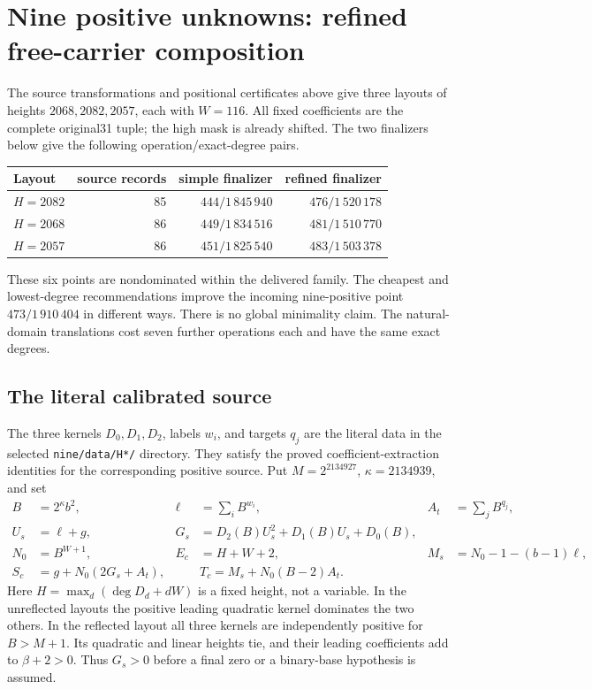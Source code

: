 \section{Nine positive unknowns: refined free-carrier composition}
\label{sec:refined-free-nine}

The source transformations and positional certificates above give three
layouts of heights $2068,2082,2057$, each with $W=116$.  All fixed coefficients
are the complete original31 tuple; the high mask is already shifted.
The two finalizers below give the following operation/exact-degree pairs.
\begin{center}
\begin{tabular}{lrrr}
Layout&source records&simple finalizer&refined finalizer\\\hline
$H=2082$&85&$444/1\,845\,940$&$476/1\,520\,178$\\
$H=2068$&86&$449/1\,834\,516$&$481/1\,510\,770$\\
$H=2057$&86&$451/1\,825\,540$&$483/1\,503\,378$
\end{tabular}
\end{center}
These six points are nondominated within the delivered family.  The cheapest
and lowest-degree recommendations improve the incoming nine-positive point
$473/1\,910\,404$ in different ways.  There is no global minimality claim.
The natural-domain translations cost seven further operations each and have
the same exact degrees.

\subsection{The literal calibrated source}
The three kernels $D_0,D_1,D_2$, labels $w_i$, and targets $q_j$ are the
literal data in the selected \texttt{nine/data/H*/} directory.  They satisfy
the proved coefficient-extraction identities for the corresponding positive
source.  Put $M=2^{2134927}$, $\kappa=2134939$, and set
{\small
\begin{align*}
 B&=2^\kappa b^2,&\ell&=\sum_i B^{w_i},& A_t&=\sum_jB^{q_j},\\
 U_s&=\ell+g,&G_s&=D_2(B)U_s^2+D_1(B)U_s+D_0(B),\\
 N_0&=B^{W+1},&E_c&=H+W+2,&M_s&=N_0-1-(b-1)\ell,\\
 S_c&=g+N_0(2G_s+A_t),&&T_c=M_s+N_0(B-2)A_t.
\end{align*}
}
Here $H=\max_d(\deg D_d+dW)$ is a fixed height, not a variable.
In the unreflected layouts the positive leading quadratic kernel dominates
the two others.  In the reflected layout all three kernels are independently
positive for $B>M+1$.  Its quadratic and linear heights tie, and their
leading coefficients add to $\beta+2>0$.  Thus $G_s>0$ before a final zero
or a binary-base hypothesis is assumed.

